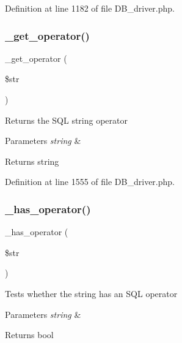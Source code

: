 Definition at line 1182 of file D\+B\+\_\+driver.\+php.

\mbox{\label{class_c_i___d_b__driver_af932ab30583179e70fa44f91dc9c5b4d}} 
\subsubsection{\texorpdfstring{\_get\_operator()}{\_get\_operator()}}
{\footnotesize\ttfamily \+\_\+get\+\_\+operator (\begin{DoxyParamCaption}\item[{}]{\$str }\end{DoxyParamCaption})\hspace{0.3cm}{\ttfamily [protected]}}

Returns the S\+QL string operator


\begin{DoxyParams}{Parameters}
{\em string} & \\
\hline
\end{DoxyParams}
\begin{DoxyReturn}{Returns}
string 
\end{DoxyReturn}


Definition at line 1555 of file D\+B\+\_\+driver.\+php.

\mbox{\label{class_c_i___d_b__driver_a2e0ab20a3cd2941eaa854fe0b4a81e6b}} 
\subsubsection{\texorpdfstring{\_has\_operator()}{\_has\_operator()}}
{\footnotesize\ttfamily \+\_\+has\+\_\+operator (\begin{DoxyParamCaption}\item[{}]{\$str }\end{DoxyParamCaption})\hspace{0.3cm}{\ttfamily [protected]}}

Tests whether the string has an S\+QL operator


\begin{DoxyParams}{Parameters}
{\em string} & \\
\hline
\end{DoxyParams}
\begin{DoxyReturn}{Returns}
bool 
\end{DoxyReturn}


